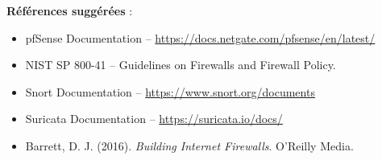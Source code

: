 \textbf{Références suggérées} :
\begin{itemize}
	\item pfSense Documentation – \url{https://docs.netgate.com/pfsense/en/latest/}
	\item NIST SP 800-41 – Guidelines on Firewalls and Firewall Policy.
	\item Snort Documentation – \url{https://www.snort.org/documents}
	\item Suricata Documentation – \url{https://suricata.io/docs/}
	\item Barrett, D. J. (2016). \textit{Building Internet Firewalls}. O’Reilly Media.
\end{itemize}

